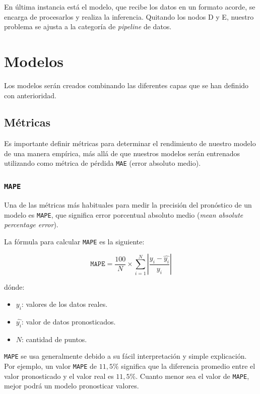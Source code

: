 \documentclass[a4paper,12pt]{article}
\begin{document}
		En última instancia está el modelo, que recibe los datos en un formato acorde, se encarga de procesarlos y realiza la inferencia. Quitando los nodos D y E, nuestro problema se ajusta a la categoría de \textit{pipeline} de datos.
				
		\clearpage
				
		\section{Modelos}\label{TrainingModel}
				
		Los modelos serán creados combinando las diferentes capas que se han definido con anterioridad.
				
		\subsection{Métricas}
				
		Es importante definir métricas para determinar el rendimiento de nuestro modelo de una manera empírica, más allá de que nuestros modelos serán entrenados utilizando como métrica de pérdida \texttt{MAE} (error absoluto medio).
				
		\subsubsection{\texttt{MAPE}}
				
		Una de las métricas más habituales para medir la precisión del pronóstico de un modelo es \texttt{MAPE}, que significa error porcentual absoluto medio (\textit{mean absolute percentage error}). \citep{MAPE}
				
		La fórmula para calcular \texttt{MAPE} es la siguiente:
				
		$$ \texttt{MAPE} = \frac{100}{N} \times \sum_{i=1}^{N} |\frac{y_i - \hat{y_i}}{y_i}| $$
				
		dónde:
				
		\begin{itemize}[noitemsep, topsep=2pt]
			\item $ y_i$: valores de los datos reales.
			\item $ \hat{y_i}$: valor de datos pronosticados.
			\item $ N $: cantidad de puntos.
		\end{itemize}
				
		\texttt{MAPE} se usa generalmente debido a su fácil interpretación y simple explicación. Por ejemplo, un valor \texttt{MAPE} de $11,5\%$ significa que la diferencia promedio entre el valor pronosticado y el valor real es $11,5\%$. Cuanto menor sea el valor de \texttt{MAPE}, mejor podrá un modelo pronosticar valores.
				
\end{document}
